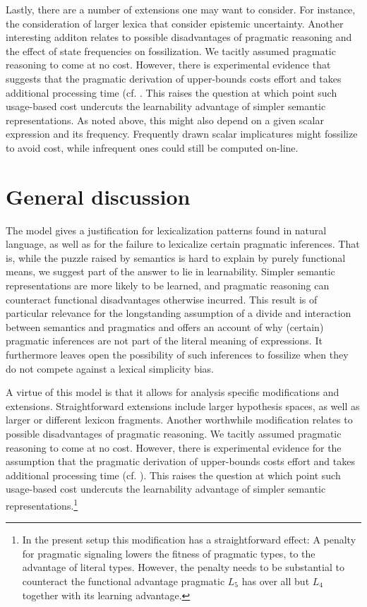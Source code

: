 \documentclass[a4paper]{article}
\begin{document}
Lastly, there are a number of extensions one may want to consider. For instance, the consideration of larger lexica that consider epistemic uncertainty. Another interesting additon relates to possible disadvantages of pragmatic reasoning and the effect of state frequencies on fossilization. We tacitly assumed pragmatic reasoning to come at no cost. However, there is experimental evidence that suggests  that the pragmatic derivation of upper-bounds costs effort and takes additional processing time (cf. \citealt{deNeys+schaeken:2007, huang+snedeker:2009}. This raises the question at which point such usage-based cost undercuts the learnability advantage of simpler semantic representations. As noted above, this might also depend on a given scalar expression and its frequency. Frequently drawn scalar implicatures might fossilize to avoid cost, while infrequent ones could still be computed on-line. 



\section{General discussion}
The model gives a justification for lexicalization patterns found in natural language, as well as for the failure to lexicalize certain pragmatic inferences. That is, while the puzzle raised by semantics is hard to explain by purely functional means, we suggest part of the answer to lie in learnability. Simpler semantic representations are more likely to be learned, and pragmatic reasoning can counteract functional disadvantages  otherwise incurred. This result is of particular relevance for the longstanding assumption of a divide and interaction between semantics and pragmatics and offers an account of why (certain) pragmatic inferences are not part of the literal meaning of expressions. It furthermore leaves open the possibility of such inferences to fossilize when they do not compete against a lexical simplicity bias.

A virtue of this model is that it allows for analysis specific modifications and extensions. Straightforward extensions include larger hypothesis spaces, as well as larger or different lexicon fragments. Another worthwhile modification relates to possible disadvantages of pragmatic reasoning. We tacitly assumed pragmatic reasoning to come at no cost. However, there is experimental evidence for the assumption that the pragmatic derivation of upper-bounds costs effort and takes additional processing time (cf. \citealt{deNeys+schaeken:2007, huang+snedeker:2009}). This raises the question at which point such usage-based cost undercuts the learnability advantage of simpler semantic representations.\footnote{In the present setup this modification has a straightforward effect: A penalty for pragmatic signaling lowers the fitness of pragmatic types, to the advantage of literal types. However, the penalty needs to be substantial to counteract the functional advantage pragmatic $L_5$ has over all but $L_4$ together with its learning advantage.}
\end{document}
